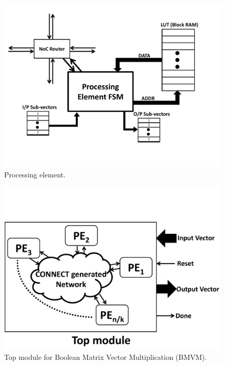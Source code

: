 \documentclass[conference, 9pt]{IEEEtran}
\begin{document}
\begin{figure}[t!]
\centering
\includegraphics[scale=0.3]{figs/processing_element.pdf}
\caption{Processing element.}
\label{fig:pe}
\end{figure}

\begin{figure}[t!]
\centering
\includegraphics[scale=0.3]{figs/mult_top.pdf}
\caption{Top module for Boolean Matrix Vector Multiplication (BMVM).}
\label{fig:mult_top}
\end{figure}
\end{document}
